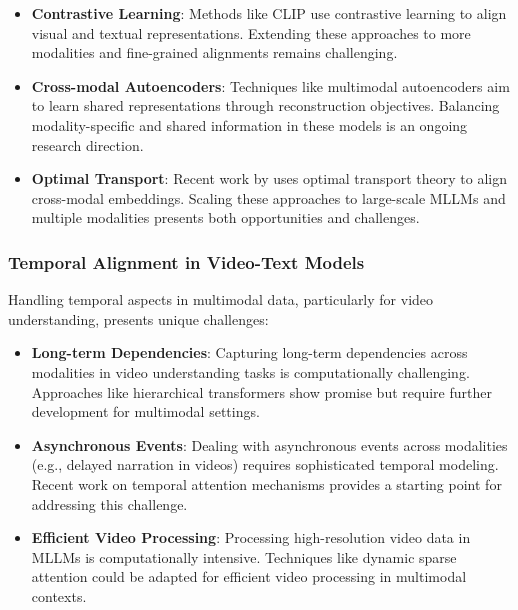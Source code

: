 \begin{itemize}
    \item \textbf{Contrastive Learning}: Methods like CLIP \citep{radford2021learning} use contrastive learning to align visual and textual representations. Extending these approaches to more modalities and fine-grained alignments remains challenging.
    
    \item \textbf{Cross-modal Autoencoders}: Techniques like multimodal autoencoders \citep{ngiam2011multimodal} aim to learn shared representations through reconstruction objectives. Balancing modality-specific and shared information in these models is an ongoing research direction.
    
    \item \textbf{Optimal Transport}: Recent work by \citet{chen2020optimal} uses optimal transport theory to align cross-modal embeddings. Scaling these approaches to large-scale MLLMs and multiple modalities presents both opportunities and challenges.
\end{itemize}

\subsubsection{Temporal Alignment in Video-Text Models}
Handling temporal aspects in multimodal data, particularly for video understanding, presents unique challenges:

\begin{itemize}
    \item \textbf{Long-term Dependencies}: Capturing long-term dependencies across modalities in video understanding tasks is computationally challenging. Approaches like hierarchical transformers \citep{liu2021video} show promise but require further development for multimodal settings.
    
    \item \textbf{Asynchronous Events}: Dealing with asynchronous events across modalities (e.g., delayed narration in videos) requires sophisticated temporal modeling. Recent work on temporal attention mechanisms \citep{zhou2018end} provides a starting point for addressing this challenge.
    
    \item \textbf{Efficient Video Processing}: Processing high-resolution video data in MLLMs is computationally intensive. Techniques like dynamic sparse attention \citep{child2019generating} could be adapted for efficient video processing in multimodal contexts.
\end{itemize}


